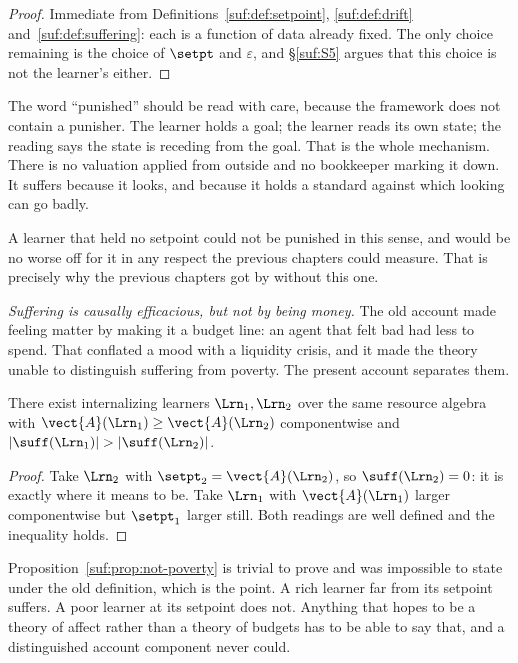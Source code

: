 \begin{proof}
Immediate from Definitions~\ref{suf:def:setpoint},
\ref{suf:def:drift} and~\ref{suf:def:suffering}: each is a function of
data already fixed.
The only choice remaining is the choice of $\setpt$ and $\varepsilon$,
and \S\ref{suf:S5} argues that this choice is not the learner's either.
\end{proof}

\begin{remark}
\label{suf:rem:sees}
The word ``punished'' should be read with care, because the framework
does not contain a punisher.
The learner holds a goal; the learner reads its own state; the reading
says the state is receding from the goal.
That is the whole mechanism.
There is no valuation applied from outside and no bookkeeper marking it
down.
It suffers because it looks, and because it holds a standard against
which looking can go badly.

A learner that held no setpoint could not be punished in this sense, and
would be no worse off for it in any respect the previous chapters could
measure.
That is precisely why the previous chapters got by without this one.
\end{remark}

\emph{Suffering is causally efficacious, but not by being money.}
The old account made feeling matter by making it a budget line: an agent
that felt bad had less to spend.
That conflated a mood with a liquidity crisis, and it made the theory
unable to distinguish suffering from poverty.
The present account separates them.

\begin{proposition}
\label{suf:prop:not-poverty}
There exist internalizing learners $\Lrn_1, \Lrn_2$ over the same
resource algebra with $\vect{A}(\Lrn_1) \geq \vect{A}(\Lrn_2)$
componentwise and $|\suff(\Lrn_1)| > |\suff(\Lrn_2)|$.
\end{proposition}

\begin{proof}
Take $\Lrn_2$ with $\setpt_2 = \vect{A}(\Lrn_2)$, so
$\suff(\Lrn_2) = 0$: it is exactly where it means to be.
Take $\Lrn_1$ with $\vect{A}(\Lrn_1)$ larger componentwise but
$\setpt_1$ larger still.
Both readings are well defined and the inequality holds.
\end{proof}

\begin{remark}
\label{suf:rem:why-independence}
Proposition~\ref{suf:prop:not-poverty} is trivial to prove and was
impossible to state under the old definition, which is the point.
A rich learner far from its setpoint suffers.
A poor learner at its setpoint does not.
Anything that hopes to be a theory of affect rather than a theory of
budgets has to be able to say that, and a distinguished account component
never could.
\end{remark}

